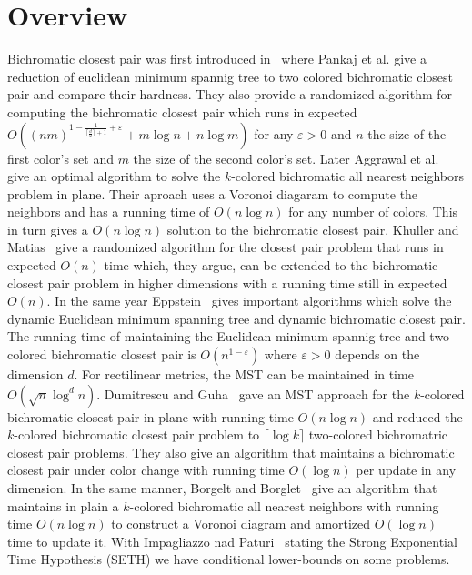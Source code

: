 \documentclass[a4paper,UKenglish,cleveref, autoref, thm-restate]{lipics-v2021}
\begin{document}
\section{Overview}

Bichromatic closest pair was first introduced in~\cite{Pankaj1990} where Pankaj et al. give a reduction of euclidean minimum spannig tree to two colored bichromatic closest pair and compare their hardness.
They also provide a randomized algorithm for computing the bichromatic closest pair which runs in expected $O((nm)^{1-\frac{1}{\lceil \frac{d}{2} \rceil + 1} + \varepsilon} + m \log n + n \log m)$ for any $\varepsilon > 0$ and $n$ the size of the first color's set and $m$ the size of the second color's set.
Later Aggrawal et al.~\cite{Aggrawal1992} give an optimal algorithm to solve the $k$-colored bichromatic all nearest neighbors problem in plane.
Their aproach uses a Voronoi diagaram to compute the neighbors and has a running time of $O(n \log n)$ for any number of colors.
This in turn gives a $O(n \log n)$ solution to the bichromatic closest pair.
Khuller and Matias~\cite{Khuller1995} give a randomized algorithm for the closest pair problem that runs in expected $O(n)$ time which, they argue, can be extended to the bichromatic closest pair problem in higher dimensions with a running time still in expected $O(n)$.
In the same year Eppstein~\cite{Eppstein1995} gives important algorithms which solve the dynamic Euclidean minimum spanning tree and dynamic bichromatic closest pair.
The running time of maintaining the Euclidean minimum spannig tree and two colored bichromatic closest pair is $O(n^{1 - \varepsilon})$ where $\varepsilon > 0$ depends on the dimension $d$.
For rectilinear metrics, the MST can be maintained in time $O(\sqrt{n} \log^d n)$.
Dumitrescu and Guha~\cite{Dumitrescu2002} gave an MST approach for the $k$-colored bichromatic closest pair in plane with running time $O(n \log n)$ and reduced the $k$-colored bichromatic closest pair problem to $\lceil \log k \rceil$ two-colored bichromatric closest pair problems.
They also give an algorithm that maintains a bichromatic closest pair under color change with running time $O(\log n)$ per update in any dimension.
In the same manner, Borgelt and Borglet~\cite{Borgelt2008} give an algorithm that maintains in plain a $k$-colored bichromatic all nearest neighbors with running time $O(n\log n)$ to construct a Voronoi diagram and amortized $O(\log n)$ time to update it.
With Impagliazzo nad Paturi~\cite{Impagliazzo2001} stating the Strong Exponential Time Hypothesis (SETH) we have conditional lower-bounds on some problems.
\end{document}
